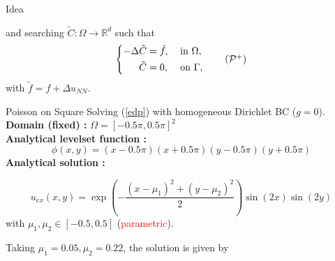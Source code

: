 \begin{frame}{Idea}
	\vspace{-8pt}
	\begin{minipage}{\linewidth}
		and searching $\tilde{C}: \Omega \rightarrow \mathbb{R}^d$ such that
		\begin{equation}
			\left\{\begin{aligned}
				-\Delta \tilde{C}&=\tilde{f}, \; &&\text{in } \Omega, \\
				\tilde{C}&=0, \; &&\text{on } \Gamma,
			\end{aligned}\right. \label{corr_add} \tag{$\mathcal{P}^{+}$}
		\end{equation}
		with $\tilde{f}=f+\Delta u_{NN}$.  
	\end{minipage}
\end{frame}

\begin{frame}{Poisson on Square}
	Solving (\ref{edp}) with homogeneous Dirichlet BC ($g=0$). \\
	 \textbf{Domain (fixed) :} $\Omega=[−0.5\pi,0.5\pi]^2$ \\
	 \textbf{Analytical levelset function :}
	\small
	\begin{equation*}
		\phi(x,y)=(x-0.5\pi)(x+0.5\pi)(y-0.5\pi)(y+0.5\pi)
	\end{equation*} 
	 \textbf{Analytical solution :}
	\small
	
	\vspace{-8pt}
	\begin{equation*}
		u_{ex}(x,y)=\exp\left(−\frac{(x-\mu_1)^2+(y-\mu_2)^2}{2}\right)\sin(2x)\sin(2y)
	\end{equation*} 
	\normalsize
	with $\mu_1,\mu_2\in[-0.5,0.5]$ (\textcolor{red}{parametric}). 
	
	\vspace{8pt}
	Taking $\mu_1=0.05,\mu_2=0.22$, the solution is given by
	\begin{minipage}{0.68\linewidth}
		\centering
	\end{minipage}
	\begin{minipage}{0.28\linewidth}
		\flushright
	\end{minipage}
\end{frame}

